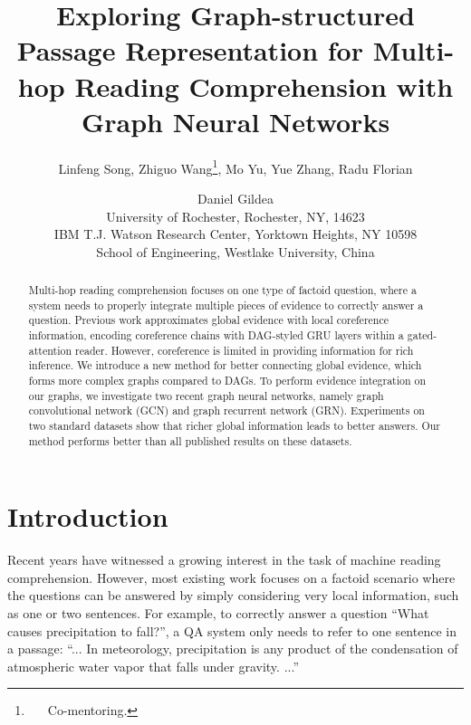 \documentclass[letterpaper]{article}
\begin{document}
\title{Exploring Graph-structured Passage Representation for Multi-hop Reading Comprehension with Graph Neural Networks}
\author{Linfeng Song, Zhiguo Wang\thanks{~~~Co-mentoring.}, Mo Yu, Yue Zhang, Radu Florian \and Daniel Gildea \\
University of Rochester, Rochester, NY, 14623\\
IBM T.J. Watson Research Center, Yorktown Heights, NY 10598\\
School of Engineering, Westlake University, China\\
}

\maketitle
\begin{abstract}
Multi-hop reading comprehension focuses on one type of factoid question, where a system needs to properly integrate multiple pieces of evidence to correctly answer a question. 
Previous work approximates global evidence with local coreference information, encoding coreference chains with DAG-styled GRU layers within a gated-attention reader.
However, coreference is limited in providing information for rich inference.
We introduce a new method for better connecting global evidence, which forms more complex graphs compared to DAGs.
To perform evidence integration on our graphs, we investigate two recent graph neural networks, namely graph convolutional network (GCN) and graph recurrent network (GRN).
Experiments on two standard datasets show that richer global information leads to better answers.
Our method performs better than all published results on these datasets.
\end{abstract}

\section{Introduction}
\noindent Recent years have witnessed a growing interest in the task of machine reading comprehension.
However, most existing work \citep{hermann2015teaching,wang2016machine,seo2016bidirectional,wang2016multi,weissenborn2017making,dhingra-EtAl:2017:Long2,shen2017reasonet} focuses on a factoid scenario where the questions can be answered by simply considering very local information, such as one or two sentences.
For example, to correctly answer a question ``What causes precipitation to fall?'',
a QA system only needs to refer to one sentence in a passage: ``... In meteorology, precipitation is any product of the condensation of atmospheric water vapor that falls under gravity. ...'' 
\end{document}
